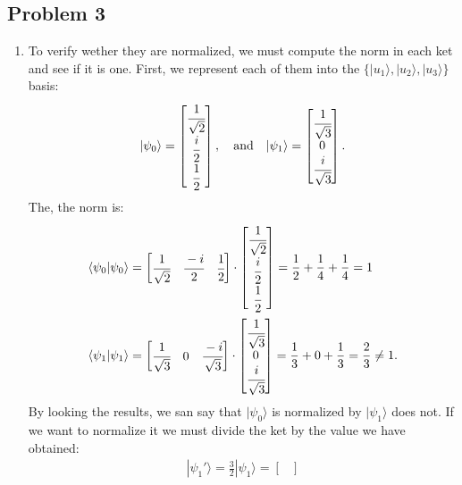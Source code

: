 \documentclass[letterpaper,11pt,twoside]{article}
\newcommand{\ket}[1]{|#1\rangle}
\newcommand{\braket}[1]{\langle#1\rangle}
\begin{document}
\subsection*{Problem 3}
\begin{enumerate}[itemsep=0pt,topsep=0pt,label=\alph*.]
  \item To verify wether they are normalized, we must compute the norm in each ket and see if it is one. First, we represent each of them into the $\{\ket{u_1},\ket{u_2},\ket{u_3}\}$ basis:
  \begin{align*}
    \ket{\psi_0}=\begin{bmatrix}
      \cfrac{1}{\sqrt{2}}\\\cfrac{i}{2}\\\cfrac{1}{2}
    \end{bmatrix},\quad\text{and}\quad
    \ket{\psi_1}=\begin{bmatrix}
      \cfrac{1}{\sqrt{3}}\\0\\\cfrac{i}{\sqrt{3}}
    \end{bmatrix}.
  \end{align*} 
  The, the norm is:
  \begin{align*}
    \braket{\psi_0|\psi_0}&=\begin{bmatrix}
      \cfrac{1}{\sqrt{2}}&\cfrac{-i}{2}&\cfrac{1}{2}
    \end{bmatrix}\cdot\begin{bmatrix}
      \cfrac{1}{\sqrt{2}}\\\cfrac{i}{2}\\\cfrac{1}{2}
    \end{bmatrix}=\frac{1}{2}+\frac{1}{4}+\frac{1}{4}=1\\
    \braket{\psi_1|\psi_1}&=\begin{bmatrix}
      \cfrac{1}{\sqrt{3}}&0&\cfrac{-i}{\sqrt{3}}
    \end{bmatrix}\cdot\begin{bmatrix}
      \cfrac{1}{\sqrt{3}}\\0\\\cfrac{i}{\sqrt{3}}
    \end{bmatrix}=\frac{1}{3}+0+\frac{1}{3}=\frac{2}{3}\neq1.
  \end{align*}
  By looking the results, we san say that $\ket{\psi_0}$ is normalized by $\ket{\psi_1}$ does not. If we want to normalize it we must divide the ket by the value we have obtained:
  \begin{align*}
    \ket{\psi_1'}=\frac{3}{2}\ket{\psi_1}=\begin{bmatrix}

\end{bmatrix}
\end{align*}
\end{enumerate}
\end{document}

